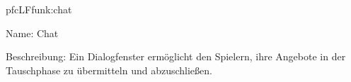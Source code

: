 \begin{description}[leftmargin=5em, style=sameline]
	\begin{lhp}{pfc}{LF}{funk:chat}
		\item [Name:] Chat
		\item [Beschreibung:] Ein Dialogfenster ermöglicht den Spielern, ihre Angebote in der Tauschphase zu übermitteln und abzuschließen.
	\end{lhp}

\end{description}

%
%


